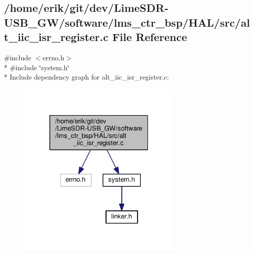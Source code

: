 \subsection{/home/erik/git/dev/\+Lime\+S\+D\+R-\/\+U\+S\+B\+\_\+\+G\+W/software/lms\+\_\+ctr\+\_\+bsp/\+H\+A\+L/src/alt\+\_\+iic\+\_\+isr\+\_\+register.c File Reference}
\label{alt__iic__isr__register_8c}
{\ttfamily \#include $<$errno.\+h$>$}\\*
{\ttfamily \#include \char`\"{}system.\+h\char`\"{}}\\*
Include dependency graph for alt\+\_\+iic\+\_\+isr\+\_\+register.\+c\+:
\nopagebreak
\begin{figure}[H]
\begin{center}
\leavevmode
\includegraphics[width=229pt]{da/d0c/alt__iic__isr__register_8c__incl}
\end{center}
\end{figure}
